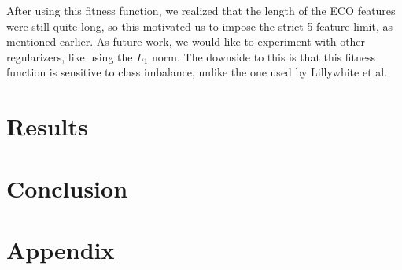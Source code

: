 \documentclass[conference]{IEEEtran}
\begin{document}
After using this fitness function, we realized that the length of the ECO features were still quite long, so this motivated us to impose the strict 5-feature limit, as mentioned earlier. As future work, we would like to experiment with other regularizers, like using the $L_1$ norm. The downside to this is that this fitness function is sensitive to class imbalance, unlike the one used by Lillywhite et al. 

\section{Results}
\section{Conclusion}
\section{Appendix}
%


\end{document}
